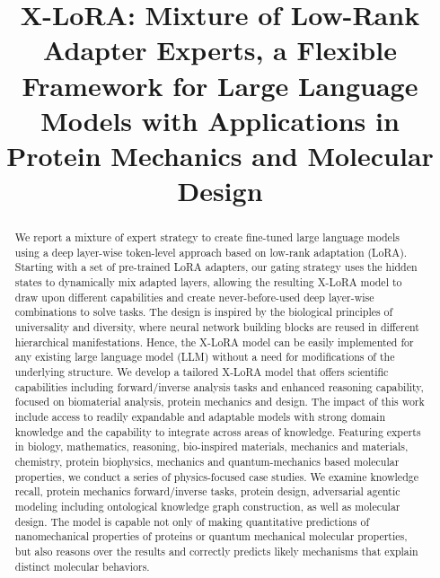 \title{X-LoRA: Mixture of Low-Rank Adapter Experts, a Flexible Framework for Large Language Models with Applications in Protein Mechanics and Molecular Design}

\begin{abstract}
We report a mixture of expert strategy to create fine-tuned large language models using a deep layer-wise token-level approach based on low-rank adaptation (LoRA). Starting with a set of pre-trained LoRA adapters, our gating strategy uses the hidden states to dynamically mix adapted layers, allowing the resulting X-LoRA model to draw upon different capabilities and create never-before-used deep layer-wise combinations to solve tasks. The design is inspired by the biological principles of universality and diversity, where neural network building blocks are reused in different hierarchical manifestations. Hence, the X-LoRA model can be easily implemented for any existing large language model (LLM) without a need for modifications of the underlying structure. We develop a tailored X-LoRA model that offers scientific capabilities including forward/inverse analysis tasks and enhanced reasoning capability, focused on biomaterial analysis, protein mechanics and design. The impact of this work include access to readily expandable and adaptable models with strong domain knowledge and the capability to integrate across areas of knowledge. Featuring experts in biology, mathematics, reasoning, bio-inspired materials, mechanics and materials, chemistry, protein biophysics, mechanics and quantum-mechanics based molecular properties, we conduct a series of physics-focused case studies. We examine knowledge recall, protein mechanics forward/inverse tasks, protein design, adversarial agentic modeling including ontological knowledge graph construction, as well as molecular design. The model is capable not only of making quantitative predictions of nanomechanical properties of proteins or quantum mechanical molecular properties, but also reasons over the results and correctly predicts likely mechanisms that explain distinct molecular behaviors.
\end{abstract}


